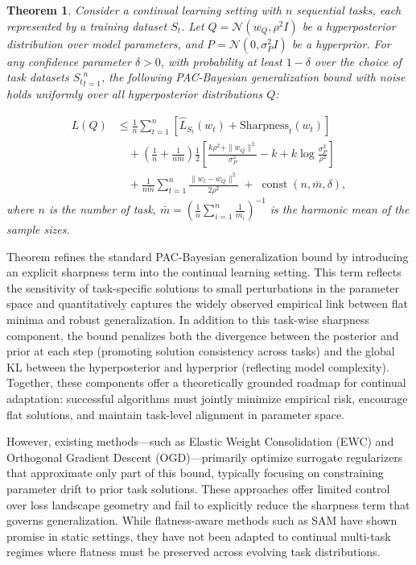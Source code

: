 \documentclass[letterpaper]{article} %
\newtheorem{theorem}{Theorem}
\begin{document}
\begin{theorem} 
Consider a continual learning setting with $n$ sequential tasks, each represented by a training dataset $S_t$. Let $Q = \mathcal{N}(w_Q, \rho^2 I)$ be a hyperposterior distribution over model parameters, and $P = \mathcal{N}(0, \sigma_P^2 I)$ be a hyperprior. For any confidence parameter $\delta > 0$, with probability at least $1 - \delta$ over the choice of task datasets ${S_t}_{t=1}^n$, the following PAC-Bayesian generalization bound with noise holds uniformly over all hyperposterior distributions $Q$:

\begin{equation}
\begin{aligned} L(Q)  &\leq \frac{1}{n}\sum_{t=1}^{n}\left[\hat{L}_{S_t}(w_t) + \mathrm{Sharpness}_t(w_t)\right] \\ &\quad+ \left(\frac{1}{n}+\frac{1}{n\bar{m}}\right)\frac{1}{2}\left[\frac{k\rho^2 + \|w_Q\|^2}{\sigma_P^2}-k+k\log\frac{\sigma_P^2}{\rho^2}\right] \\ &\quad+ \frac{1}{n\bar{m}}\sum_{t=1}^{n}\frac{\|w_t - w_Q\|^2}{2\rho^2}\;+\;\operatorname{const}(n,\bar{m},\delta), \end{aligned}
\end{equation}
where $n$ is the number of task, $\bar{m}=\left(\frac{1}{n} \sum_{i=1}^n \frac{1}{m_i}\right)^{-1}$ is the harmonic mean of the sample sizes. 
\end{theorem}

Theorem  refines the standard PAC-Bayesian generalization bound by introducing an explicit sharpness term into the continual learning setting. This term reflects the sensitivity of task-specific solutions to small perturbations in the parameter space and quantitatively captures the widely observed empirical link between flat minima and robust generalization. In addition to this task-wise sharpness component, the bound penalizes both the divergence between the posterior and prior at each step (promoting solution consistency across tasks) and the global KL between the hyperposterior and hyperprior (reflecting model complexity). Together, these components offer a theoretically grounded roadmap for continual adaptation: successful algorithms must jointly minimize empirical risk, encourage flat solutions, and maintain task-level alignment in parameter space.

However, existing methods—such as Elastic Weight Consolidation (EWC) and Orthogonal Gradient Descent (OGD)—primarily optimize surrogate regularizers that approximate only part of this bound, typically focusing on constraining parameter drift to prior task solutions. These approaches offer limited control over loss landscape geometry and fail to explicitly reduce the sharpness term that governs generalization. While flatness-aware methods such as SAM have shown promise in static settings, they have not been adapted to continual multi-task regimes where flatness must be preserved across evolving task distributions.
\end{document}

